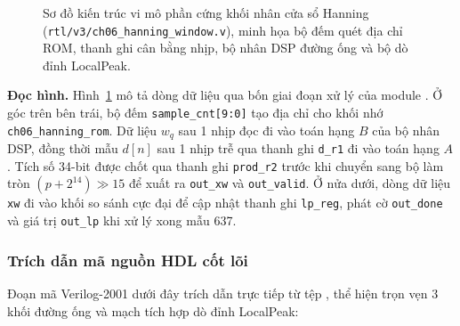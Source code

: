 \begin{figure}[H]
\centering
\resizebox{0.98\textwidth}{!}{}
\caption{Sơ đồ kiến trúc vi mô phần cứng khối nhân cửa sổ Hanning (\texttt{rtl/v3/ch06\_hanning\_window.v}), minh họa bộ đếm quét địa chỉ ROM, thanh ghi cân bằng nhịp, bộ nhân DSP đường ống và bộ dò đỉnh LocalPeak.}
\label{fig:ch06_window_arch}
\end{figure}

\textbf{Đọc hình.} Hình~\ref{fig:ch06_window_arch} mô tả dòng dữ liệu qua bốn giai đoạn xử lý của module . Ở góc trên bên trái, bộ đếm \texttt{sample\_cnt[9:0]} tạo địa chỉ cho khối nhớ \texttt{ch06\_hanning\_rom}. Dữ liệu $w_q$ sau 1 nhịp đọc đi vào toán hạng $B$ của bộ nhân DSP, đồng thời mẫu $d[n]$ sau 1 nhịp trễ qua thanh ghi \texttt{d\_r1} đi vào toán hạng $A$. Tích số 34-bit được chốt qua thanh ghi \texttt{prod\_r2} trước khi chuyển sang bộ làm tròn $(p + 2^{14}) \gg 15$ để xuất ra \texttt{out\_xw} và \texttt{out\_valid}. Ở nửa dưới, dòng dữ liệu \texttt{xw} đi vào khối so sánh cực đại để cập nhật thanh ghi \texttt{lp\_reg}, phát cờ \texttt{out\_done} và giá trị \texttt{out\_lp} khi xử lý xong mẫu 637.

\subsubsection*{Trích dẫn mã nguồn HDL cốt lõi}
Đoạn mã Verilog-2001 dưới đây trích dẫn trực tiếp từ tệp , thể hiện trọn vẹn 3 khối đường ống và mạch tích hợp dò đỉnh LocalPeak:



